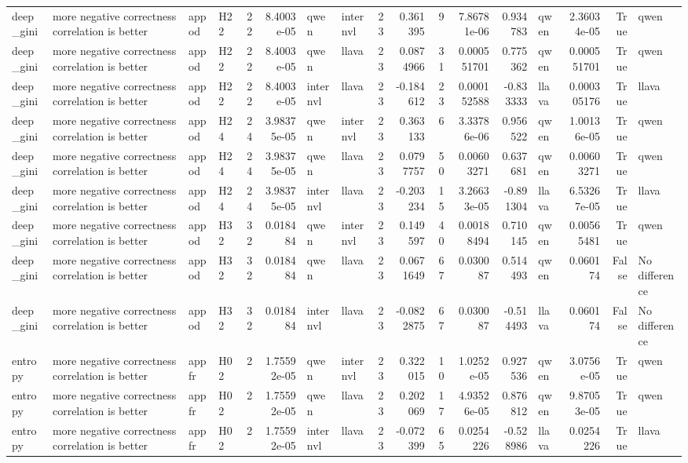 \begin{longtable}{llllrrllrrrrrlrrl}
deep\_gini & more negative correctness correlation is better & appod & H22 & 22 & 8.4003e-05 & qwen & internvl & 23 & 0.361395 & 9 & 7.86781e-06 & 0.934783 & qwen & 2.36034e-05 & True & qwen \\
deep\_gini & more negative correctness correlation is better & appod & H22 & 22 & 8.4003e-05 & qwen & llava & 23 & 0.0874966 & 31 & 0.000551701 & 0.775362 & qwen & 0.000551701 & True & qwen \\
deep\_gini & more negative correctness correlation is better & appod & H22 & 22 & 8.4003e-05 & internvl & llava & 23 & -0.184612 & 23 & 0.000152588 & -0.833333 & llava & 0.000305176 & True & llava \\
deep\_gini & more negative correctness correlation is better & appod & H24 & 24 & 3.98375e-05 & qwen & internvl & 23 & 0.363133 & 6 & 3.33786e-06 & 0.956522 & qwen & 1.00136e-05 & True & qwen \\
deep\_gini & more negative correctness correlation is better & appod & H24 & 24 & 3.98375e-05 & qwen & llava & 23 & 0.0797757 & 50 & 0.00603271 & 0.637681 & qwen & 0.00603271 & True & qwen \\
deep\_gini & more negative correctness correlation is better & appod & H24 & 24 & 3.98375e-05 & internvl & llava & 23 & -0.203234 & 15 & 3.26633e-05 & -0.891304 & llava & 6.53267e-05 & True & llava \\
deep\_gini & more negative correctness correlation is better & appod & H32 & 32 & 0.018484 & qwen & internvl & 23 & 0.149597 & 40 & 0.00188494 & 0.710145 & qwen & 0.00565481 & True & qwen \\
deep\_gini & more negative correctness correlation is better & appod & H32 & 32 & 0.018484 & qwen & llava & 23 & 0.0671649 & 67 & 0.030087 & 0.514493 & qwen & 0.060174 & False & No difference \\
deep\_gini & more negative correctness correlation is better & appod & H32 & 32 & 0.018484 & internvl & llava & 23 & -0.0822875 & 67 & 0.030087 & -0.514493 & llava & 0.060174 & False & No difference \\
entropy & more negative correctness correlation is better & appfr & H02 & 2 & 1.75592e-05 & qwen & internvl & 23 & 0.322015 & 10 & 1.0252e-05 & 0.927536 & qwen & 3.0756e-05 & True & qwen \\
entropy & more negative correctness correlation is better & appfr & H02 & 2 & 1.75592e-05 & qwen & llava & 23 & 0.202069 & 17 & 4.93526e-05 & 0.876812 & qwen & 9.87053e-05 & True & qwen \\
entropy & more negative correctness correlation is better & appfr & H02 & 2 & 1.75592e-05 & internvl & llava & 23 & -0.072399 & 65 & 0.0254226 & -0.528986 & llava & 0.0254226 & True & llava \\

\end{longtable}
